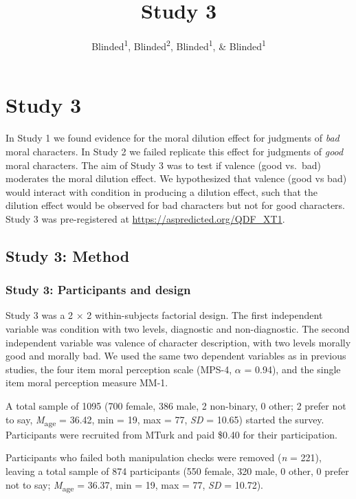 \documentclass[
  american,
  man,floatsintext]{apa7}
\title{Study 3}
\author{Blinded\textsuperscript{1}, Blinded\textsuperscript{2}, Blinded\textsuperscript{1}, \& Blinded\textsuperscript{1}}
\date{}
\affiliation{\vspace{0.5cm}\textsuperscript{1} Blinded\\\textsuperscript{2} Blinded}
\begin{document}
\maketitle

\hypertarget{study-3}{%
\section{Study 3}\label{study-3}}

In Study 1 we found evidence for the moral dilution effect for judgments of \emph{bad} moral characters. In Study 2 we failed replicate this effect for judgments of \emph{good} moral characters. The aim of Study 3 was to test if valence (good vs.~bad) moderates the moral dilution effect. We hypothesized that valence (good vs bad) would interact with condition in producing a dilution effect, such that the dilution effect would be observed for bad characters but not for good characters. Study 3 was pre-registered at \color{blue}\url{https://aspredicted.org/QDF_XT1}\color{black}.

\hypertarget{study-3-method}{%
\subsection{Study 3: Method}\label{study-3-method}}

\hypertarget{study-3-participants-and-design}{%
\subsubsection{Study 3: Participants and design}\label{study-3-participants-and-design}}

Study 3 was a 2 \(\times\) 2 within-subjects factorial design. The first independent variable was condition with two levels, diagnostic and non-diagnostic. The second independent variable was valence of character description, with two levels morally good and morally bad. We used the same two dependent variables as in previous studies, the four item moral perception scale (MPS-4, \(\alpha\) = 0.94), and the single item moral perception measure MM-1.

A total sample of 1095 (700 female, 386 male, 2 non-binary, 0 other; 2 prefer not to say, \emph{M}\textsubscript{age} = 36.42, min = 19, max = 77, \emph{SD} = 10.65) started the survey. Participants were recruited from MTurk and paid \$0.40 for their participation.

Participants who failed both manipulation checks were removed (\emph{n} = 221), leaving a total sample of 874 participants (550 female, 320 male, 0 other, 0 prefer not to say; \emph{M}\textsubscript{age} = 36.37, min = 19, max = 77, \emph{SD} = 10.72).
\end{document}
